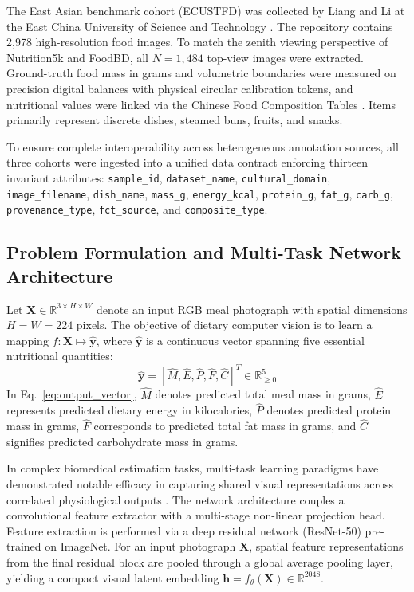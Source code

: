 \documentclass[utf8]{FrontiersinVancouver}
\begin{document}
The East Asian benchmark cohort (ECUSTFD) was collected by Liang and Li at the East China University of Science and Technology \citep{Liang2017ECUSTFD}. The repository contains 2,978 high-resolution food images. To match the zenith viewing perspective of Nutrition5k and FoodBD, all $N=1,484$ top-view images were extracted. Ground-truth food mass in grams and volumetric boundaries were measured on precision digital balances with physical circular calibration tokens, and nutritional values were linked via the Chinese Food Composition Tables \citep{Yang2009ChinaFCT}. Items primarily represent discrete dishes, steamed buns, fruits, and snacks.

To ensure complete interoperability across heterogeneous annotation sources, all three cohorts were ingested into a unified data contract enforcing thirteen invariant attributes: \texttt{sample\_id}, \texttt{dataset\_name}, \texttt{cultural\_domain}, \texttt{image\_filename}, \texttt{dish\_name}, \texttt{mass\_g}, \texttt{energy\_kcal}, \texttt{protein\_g}, \texttt{fat\_g}, \texttt{carb\_g}, \texttt{provenance\_type}, \texttt{fct\_source}, and \texttt{composite\_type}.

\subsection{Problem Formulation and Multi-Task Network Architecture}

Let $\mathbf{X} \in \mathbb{R}^{3 \times H \times W}$ denote an input RGB meal photograph with spatial dimensions $H = W = 224$ pixels. The objective of dietary computer vision is to learn a mapping $f: \mathbf{X} \mapsto \hat{\mathbf{y}}$, where $\hat{\mathbf{y}}$ is a continuous vector spanning five essential nutritional quantities:
\begin{equation}
    \label{eq:output_vector}
    \hat{\mathbf{y}} = \left[ \hat{M}, \hat{E}, \hat{P}, \hat{F}, \hat{C} \right]^T \in \mathbb{R}_{\ge 0}^5
\end{equation}
In Eq.~\ref{eq:output_vector}, $\hat{M}$ denotes predicted total meal mass in grams, $\hat{E}$ represents predicted dietary energy in kilocalories, $\hat{P}$ denotes predicted protein mass in grams, $\hat{F}$ corresponds to predicted total fat mass in grams, and $\hat{C}$ signifies predicted carbohydrate mass in grams.

In complex biomedical estimation tasks, multi-task learning paradigms have demonstrated notable efficacy in capturing shared visual representations across correlated physiological outputs \citep{Wen2026MTLCS}. The network architecture couples a convolutional feature extractor with a multi-stage non-linear projection head. Feature extraction is performed via a deep residual network (ResNet-50) \citep{He2016ResNet} pre-trained on ImageNet. For an input photograph $\mathbf{X}$, spatial feature representations from the final residual block are pooled through a global average pooling layer, yielding a compact visual latent embedding $\mathbf{h} = f_\theta(\mathbf{X}) \in \mathbb{R}^{2048}$.
\end{document}
